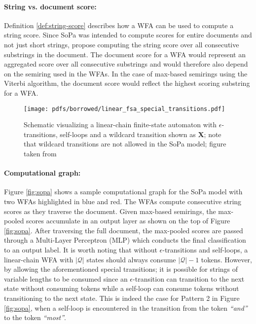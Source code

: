 \paragraph{String vs. document score:} Definition \ref{def:string-score} describes how a WFA can be used to compute a string score. Since SoPa was intended to compute scores for entire documents and not just short strings, \citet{schwartz2018sopa} propose computing the string score over all consecutive substrings in the document. The document score for a WFA would represent an aggregated score over all consecutive substrings and would therefore also depend on the semiring used in the WFAs. In the case of max-based semirings using the Viterbi algorithm, the document score would reflect the highest scoring substring for a WFA.

\begin{figure}[t]
  \centering
  \texttt{[image: pdfs/borrowed/linear\_fsa\_special\_transitions.pdf]}
  \caption{Schematic visualizing a linear-chain finite-state automaton with $\epsilon$-transitions, self-loops and a wildcard transition shown as \textbf{X}; note that wildcard transitions are not allowed in the SoPa model; figure taken from \citet{schwartz2018sopa}}
  \label{fig:fsa}
\end{figure}

\paragraph{Computational graph:} Figure \ref{fig:sopa} shows a sample computational graph for the SoPa model with two WFAs highlighted in blue and red. The WFAs compute consecutive string scores as they traverse the document. Given max-based semirings, the max-pooled scores accumulate in an output layer as shown on the top of Figure \ref{fig:sopa}. After traversing the full document, the max-pooled scores are passed through a Multi-Layer Perceptron (MLP) which conducts the final classification to an output label. It is worth noting that without $\epsilon$-transitions and self-loops, a linear-chain WFA with $|\mathcal{Q}|$ states should always consume $\mathcal{|Q|}-1$ tokens. However, by allowing the aforementioned special transitions; it is possible for strings of variable lengths to be consumed since an $\epsilon$-transition can transition to the next state without consuming tokens while a self-loop can consume tokens without transitioning to the next state. This is indeed the case for Pattern 2 in Figure \ref{fig:sopa}, when a self-loop is encountered in the transition from the token \textit{``and''} to the token \textit{``most''}.

